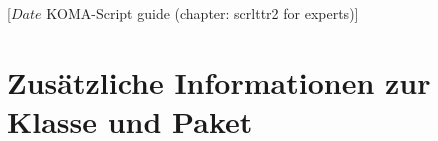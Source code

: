 %
%
%
%
%
%
%
%
%
% 
%
%
%
%

%
                 [$Date$
                  KOMA-Script guide (chapter: scrlttr2 for experts)]

\chapter{Zusätzliche Informationen zur
  Klasse  und Paket }

